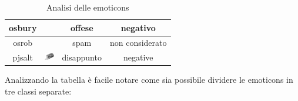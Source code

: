 \documentclass[a4paper,12pt,openright,twoside]{report}
\theoremstyle{definition}
\begin{document}
\begin{table}[H]
\begin{center}
\begin{tabular}{|c|c|c|c|}
\hline
osbury & & offese & negativo \\
\hline
osrob & & spam & non considerato \\
\hline
pjsalt & \includegraphics[height=0.4cm, width=0.4cm]{Immagini/Emoticons/pjsalt.png} & disappunto & negative \\
\hline
\end{tabular}
\end{center}
\caption{Analisi delle emoticons}
\label{tab:emoticons1}
\end{table}

Analizzando la tabella è facile notare come sia possibile dividere le emoticons in tre classi separate:
\end{document}
